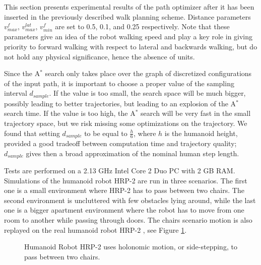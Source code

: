This section presents experimental results of the path optimizer after
it has been inserted in the previously described walk planning
scheme. Distance parameters $v_{max}^f$, $v_{max}^{lat}$, $v_{min}^f$
are set to 0.5, 0.1, and 0.25 respectively. Note that these parameters
give an idea of the robot walking speed and play a key role in giving
priority to forward walking with respect to lateral and backwards
walking, but do not hold any physical significance, hence the absence
of units.

Since the A$^{*}$ search only takes place over the graph of
discretized configurations of the input path, it is important to
choose a proper value of the sampling interval $d_{sample}$. If the
value is too small, the search space will be much bigger, possibly
leading to better trajectories, but leading to an explosion of the
A$^{*}$ search time. If the value is too high, the A$^{*}$ search will
be very fast in the small trajectory space, but we risk missing some
optimizations on the trajectory. We found that setting $d_{sample}$ to
be equal to $\frac{h}{6}$, where $h$ is the humanoid height, provided
a good tradeoff between computation time and trajectory quality;
$d_{sample}$ gives then a broad approximation of the nominal human
step length.

Tests are performed on a 2.13 GHz Intel Core 2 Duo PC with 2 GB RAM.
Simulations of the humanoid robot HRP-2 are run in three scenarios.
The first one is a small environment where HRP-2 has to pass between
two chairs. The second environment is uncluttered with few obstacles
lying around, while the last one is a bigger apartment environment
where the robot has to move from one room to another while passing
through doors. The chairs scenario motion is also replayed on the real
humanoid robot HRP-2 \cite{kane04}, see Figure
\ref{fig:chap1-hrp2-chairs}.

\begin{figure}
  \caption{Humanoid Robot HRP-2 uses holonomic motion, or
    side-stepping, to pass between two chairs.}
  \label{fig:chap1-hrp2-chairs}
\end{figure}


